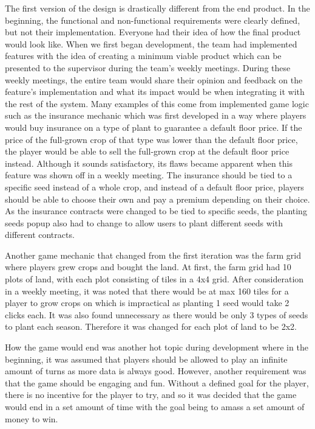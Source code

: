 \documentclass{article}
\begin{document}
The first version of the design is drastically different from the end product. In the beginning, the functional and non-functional requirements were clearly defined, but not their implementation. Everyone had their idea of how the final product would look like. When we first began development, the team had implemented features with the idea of creating a minimum viable product which can be presented to the supervisor during the team's weekly meetings. During these weekly meetings, the entire team would share their opinion and feedback on the feature's implementation and what its impact would be when integrating it with the rest of the system. Many examples of this come from implemented game logic such as the insurance mechanic which was first developed in a way where players would buy insurance on a type of plant to guarantee a default floor price. If the price of the full-grown crop of that type was lower than the default floor price, the player would be able to sell the full-grown crop at the default floor price instead. Although it sounds satisfactory, its flaws became apparent when this feature was shown off in a weekly meeting. The insurance should be tied to a specific seed instead of a whole crop, and instead of a default floor price, players should be able to choose their own and pay a premium depending on their choice. As the insurance contracts were changed to be tied to specific seeds, the planting seeds popup also had to change to allow users to plant different seeds with different contracts.

Another game mechanic that changed from the first iteration was the farm grid where players grew crops and bought the land. At first, the farm grid had 10 plots of land, with each plot consisting of tiles in a 4x4 grid. After consideration in a weekly meeting, it was noted that there would be at max 160 tiles for a player to grow crops on which is impractical as planting 1 seed would take 2 clicks each. It was also found unnecessary as there would be only 3 types of seeds to plant each season. Therefore it was changed for each plot of land to be 2x2.

How the game would end was another hot topic during development where in the beginning, it was assumed that players should be allowed to play an infinite amount of turns as more data is always good. However, another requirement was that the game should be engaging and fun. Without a defined goal for the player, there is no incentive for the player to try, and so it was decided that the game would end in a set amount of time with the goal being to amass a set amount of money to win.
\end{document}
